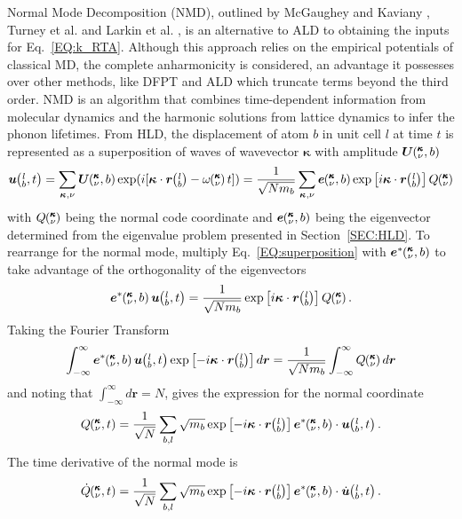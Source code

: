 Normal Mode Decomposition (NMD), outlined by McGaughey and Kaviany \cite{PhysRevB.71.184305}, Turney et al.\cite {PhysRevB.81.081411} and Larkin et al. \cite{jason_inpress}, is an alternative to ALD to obtaining the inputs for Eq.~\ref{EQ:k_RTA}. Although this approach relies on the empirical potentials of classical MD, the complete anharmonicity is considered, an advantage it possesses over other methods, like DFPT and ALD which truncate terms beyond the third order. NMD is an algorithm that combines time-dependent information from molecular dynamics and the harmonic solutions from lattice dynamics to infer the phonon lifetimes. From HLD, the displacement of atom $b$ in unit cell $l$ at time $t$ is represented as a superposition of waves of wavevector $\bm{\kappa}$ with amplitude $\bm{U}\mspace{-4.0mu}\left(\mspace{-8.0mu} \begin{smallmatrix} &\pmb{\kappa} \\ &\nu \end{smallmatrix} \mspace{-2.0mu},b\right)$
%
\begin{equation}\label{EQ:superposition}
\bm{u}\lbt=\sum_{\bm{\kappa},\nu}\bm{U}\kvb \exp(i[\bm{\kappa}\cdot\bm{r}\lb-\omega\kv t])=\frac{1}{\sqrt{Nm_b}}\sum_{\bm{\kappa},\nu}\bm{e}\kvb \exp \left[ i\bm{\kappa}\cdot\bm{r}\lb \right]Q\kv
\end{equation}
%
with $Q\mspace{-4.0mu}\left(\mspace{-8.0mu} \begin{smallmatrix}&\pmb{\kappa} \\&\nu\end{smallmatrix} \mspace{-3.0mu}\right)$ being the normal code coordinate and $\bm{e}\mspace{-4.0mu}\left(\mspace{-8.0mu} \begin{smallmatrix} &\pmb{\kappa} \\ &\nu \end{smallmatrix} \mspace{-2.0mu},b\right)$ being the eigenvector determined from the eigenvalue problem presented in Section~\ref{SEC:HLD}. To rearrange for the normal mode, multiply Eq.~\ref{EQ:superposition} with $\bm{e}^*\mspace{-4.0mu}\left(\mspace{-8.0mu} \begin{smallmatrix} &\pmb{\kappa} \\ &\nu \end{smallmatrix} \mspace{-2.0mu},b\right)$ to take advantage of the orthogonality of the eigenvectors
%
\begin{equation}
\bm{e}^*\kvb\bm{u}\lbt=\frac{1}{\sqrt{Nm_b}}\exp \left[ i\bm{\kappa}\cdot\bm{r}\lb \right] Q\kv.
\end{equation}
%
Taking the Fourier Transform
%
\begin{equation}
\int_{-\infty}^{\infty}\bm{e}^*\kvb\bm{u}\lbt \exp \left[-i\bm{\kappa}\cdot\bm{r}\lb \right ]d\bm{r}=\frac{1}{\sqrt{Nm_b}}\int_{-\infty}^{\infty}Q\kv d\bm{r}
\end{equation}
%
and noting that $\int_{-\infty}^{\infty}d\bm{r}=N$, gives the expression for the normal coordinate
%
\begin{equation}
Q\kvt=\frac{1}{\sqrt{N}}\sum_{b,l}\sqrt{m_b}\exp \left[-i\bm{\kappa}\cdot\bm{r}\lb \right] \bm{e}^*\kvb\cdot\bm{u}\lbt.
\end{equation}
%
The time derivative of the normal mode is
%
\begin{equation}\label{EQ:qdot}
\dot{Q}\kvt=\frac{1}{\sqrt{N}}\sum_{b,l}\sqrt{m_b}\exp \left[-i\bm{\kappa}\cdot\bm{r}\lb \right]\bm{e}^*\kvb\cdot\dot{\bm{u}}\lbt.
\end{equation}
